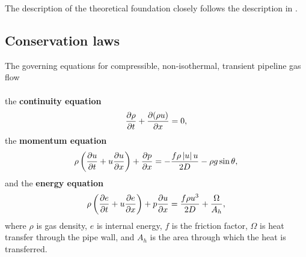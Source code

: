 The description of the theoretical foundation closely follows the description in \cite{Chaczykowski2017}. 

\subsection{Conservation laws}
The governing equations for compressible, non-isothermal, transient pipeline gas flow  \\\\
the \textbf{continuity equation}
\begin{align}
    \pdt{\rho} + \pdx{(\rho u)} = 0
, \label{eq:contEq}
\end{align}
the \textbf{momentum equation} \cite{Daneshyar1976OneDimensional}
\begin{align}
    \rho\del{\pdt{u} + u \pdx{u}} + \pdx{p} = -\frac{f\rho \abs{u} u}{2D} - \rho g \sin \theta
, \label{eq:momEq}
\end{align}
and the \textbf{energy equation} \cite{White2006Viscous}
\begin{align}
    \rho\del{\pdt{e} + u\pdx{e}} + p\pdx{u} = \frac{f\rho u^3}{2D} + \frac{\Omega}{A_h}
, \label{eq:enEq}
\end{align}
where $\rho$ is gas density, $e$ is internal energy, $f$ is the friction factor, $\Omega$ is heat transfer through the pipe wall, and $A_h$ is the area through which the heat is transferred. 


